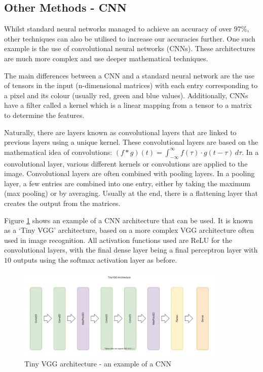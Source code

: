 \documentclass[a4paper,11pt]{article}
\theoremstyle{plain} %
\theoremstyle{definition} %
\theoremstyle{remark} %
\begin{document}
\subsection{Other Methods - CNN}

Whilst standard neural networks managed to achieve an accuracy of over $97\%$, other techniques can also be utilised to increase our accuracies further. One such example is the use of convolutional neural networks (CNNs). These architectures are much more complex and use deeper mathematical techniques. 

The main differences between a CNN and a standard neural network are the use of tensors in the input (n-dimensional matrices) with each entry corresponding to a pixel and its colour (usually red, green and blue values). Additionally, CNNs have a filter called a kernel which is a linear mapping from a tensor to a matrix to determine the features. 

Naturally, there are layers known as convolutional layers that are linked to previous layers using a unique kernel. These convolutional layers are based on the mathematical idea of convolutions: $(f * g)(t) = \int_{-\infty}^{\infty} f(\tau) \cdot g(t - \tau) \, d\tau$. In a convolutional layer, various different kernels or convolutions are applied to the image. Convolutional layers are often combined with pooling layers. In a pooling layer, a few entries  are combined into one entry, either by taking the maximum (max pooling) or by averaging. Usually at the end, there is a flattening layer that creates the output from the matrices. 

Figure \cref{VGG} shows an example of a CNN architecture that can be used. It is known as a `Tiny VGG' architecture, based on a more complex VGG architecture often used in image recognition.  All activation functions used are ReLU for the convolutional layers, with the final dense layer being a final perceptron layer with $10$ outputs using the softmax activation layer as before.

\begin{figure}[htb]
	\centering 
	\includegraphics[width=0.9\textwidth, angle=0]{VGG.png}	
	\caption{Tiny VGG architecture - an example of a CNN \citep{mediumStartedWith}} 
	\label{VGG}%
\end{figure}
\end{document}
